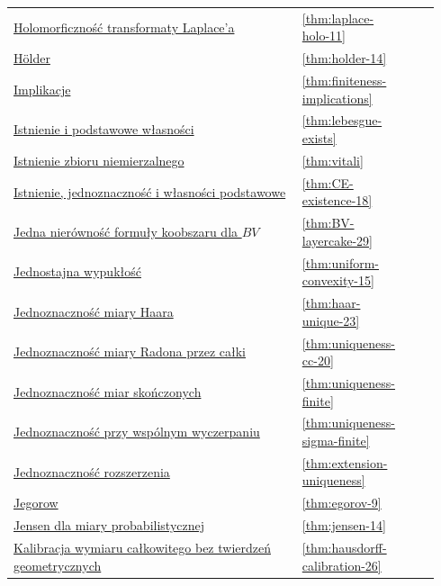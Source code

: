 \documentclass[11pt,a4paper,oneside]{book}
\numberwithin{equation}{chapter}
\theoremstyle{plain}
\theoremstyle{definition}
\theoremstyle{remark}
\begin{document}
\begin{longtable}{@{}p{0.72\linewidth}p{0.135\linewidth}p{0.08\linewidth}@{}}
\hyperref[thm:laplace-holo-11]{Holomorficzność transformaty Laplace'a} & \ref*{thm:laplace-holo-11} & \pageref*{thm:laplace-holo-11} \\
\hyperref[thm:holder-14]{Hölder} & \ref*{thm:holder-14} & \pageref*{thm:holder-14} \\
\hyperref[thm:finiteness-implications]{Implikacje} & \ref*{thm:finiteness-implications} & \pageref*{thm:finiteness-implications} \\
\hyperref[thm:lebesgue-exists]{Istnienie i podstawowe własności} & \ref*{thm:lebesgue-exists} & \pageref*{thm:lebesgue-exists} \\
\hyperref[thm:vitali]{Istnienie zbioru niemierzalnego} & \ref*{thm:vitali} & \pageref*{thm:vitali} \\
\hyperref[thm:CE-existence-18]{Istnienie, jednoznaczność i własności podstawowe} & \ref*{thm:CE-existence-18} & \pageref*{thm:CE-existence-18} \\
\hyperref[thm:BV-layercake-29]{Jedna nierówność formuły koobszaru dla $BV$} & \ref*{thm:BV-layercake-29} & \pageref*{thm:BV-layercake-29} \\
\hyperref[thm:uniform-convexity-15]{Jednostajna wypukłość} & \ref*{thm:uniform-convexity-15} & \pageref*{thm:uniform-convexity-15} \\
\hyperref[thm:haar-unique-23]{Jednoznaczność miary Haara} & \ref*{thm:haar-unique-23} & \pageref*{thm:haar-unique-23} \\
\hyperref[thm:uniqueness-cc-20]{Jednoznaczność miary Radona przez całki} & \ref*{thm:uniqueness-cc-20} & \pageref*{thm:uniqueness-cc-20} \\
\hyperref[thm:uniqueness-finite]{Jednoznaczność miar skończonych} & \ref*{thm:uniqueness-finite} & \pageref*{thm:uniqueness-finite} \\
\hyperref[thm:uniqueness-sigma-finite]{Jednoznaczność przy wspólnym wyczerpaniu} & \ref*{thm:uniqueness-sigma-finite} & \pageref*{thm:uniqueness-sigma-finite} \\
\hyperref[thm:extension-uniqueness]{Jednoznaczność rozszerzenia} & \ref*{thm:extension-uniqueness} & \pageref*{thm:extension-uniqueness} \\
\hyperref[thm:egorov-9]{Jegorow} & \ref*{thm:egorov-9} & \pageref*{thm:egorov-9} \\
\hyperref[thm:jensen-14]{Jensen dla miary probabilistycznej} & \ref*{thm:jensen-14} & \pageref*{thm:jensen-14} \\
\hyperref[thm:hausdorff-calibration-26]{Kalibracja wymiaru całkowitego bez twierdzeń geometrycznych} & \ref*{thm:hausdorff-calibration-26} & \pageref*{thm:hausdorff-calibration-26} \\

\end{longtable}
\end{document}
